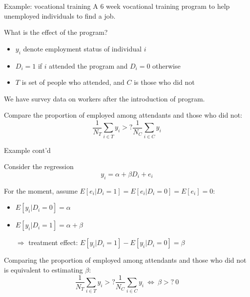 \documentclass[handout]{beamer}
\begin{document}
\begin{frame}{Example: vocational training}
A 6 week vocational training program to help unemployed individuals to find a job.\medskip

What is the effect of the program?\medskip

\begin{itemize}
	\item $y_i$ denote employment status of individual $i$
	\item $D_i=1$ if $i$ attended the program and $D_i=0$ otherwise
	\item $T$ is set of people who attended, and $C$ is those who did not
\end{itemize}\medskip

We have survey data on workers after the introduction of program.  \medskip\pause

Compare the proportion of employed among attendants and those who did not: \[\frac{1}{N_T}\sum_{i\in T}y_i>? \frac{1}{N_C}\sum_{i\in C}y_i\]


\end{frame}


\begin{frame}{Example cont'd}

Consider the regression \begin{equation}\label{e1}
y_i=\alpha+\beta D_i+e_i
\end{equation}

For the moment, assume $E[e_i|D_i=1]=E[e_i|D_i=0]=E[e_i]=0$: \begin{itemize}
\item $E[y_i|D_i=0]=\alpha$
\item $E[y_i|D_i=1]=\alpha+\beta$
\item[$\Rightarrow$] treatment effect:  $E[y_i|D_i=1]-E[y_i|D_i=0]=\beta$
\end{itemize}\medskip

Comparing the proportion of employed among attendants and those who did not is equivalent to estimating $\beta$: \[\frac{1}{N_T}\sum_{i\in T}y_i>? \frac{1}{N_C}\sum_{i\in C}y_i \ \Leftrightarrow \ \beta>? \ 0 \]

\end{frame}
\end{document}
